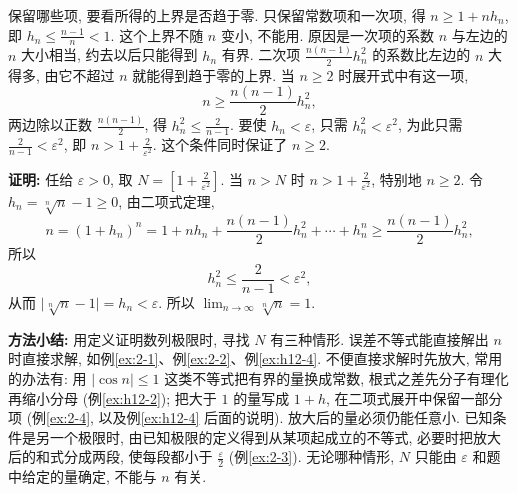 \documentclass[UTF8,openany]{ctexbook}
\theoremstyle{chinesetextbook}
\newenvironment{cnproof}{\par\indent\textbf{证明:} \ignorespaces}{\par}
\begin{document}
保留哪些项, 要看所得的上界是否趋于零. 只保留常数项和一次项, 得 $n\ge1+nh_n$, 即 $\displaystyle h_n\le\frac{n-1}n<1$. 这个上界不随 $n$ 变小, 不能用. 原因是一次项的系数 $n$ 与左边的 $n$ 大小相当, 约去以后只能得到 $h_n$ 有界. 二次项 $\displaystyle\frac{n(n-1)}2h_n^2$ 的系数比左边的 $n$ 大得多, 由它不超过 $n$ 就能得到趋于零的上界. 当 $n\ge2$ 时展开式中有这一项,
\[
n\ge\frac{n(n-1)}2h_n^2,
\]
两边除以正数 $\displaystyle\frac{n(n-1)}2$, 得 $\displaystyle h_n^2\le\frac2{n-1}$. 要使 $h_n<\varepsilon$, 只需 $h_n^2<\varepsilon^2$, 为此只需 $\displaystyle\frac2{n-1}<\varepsilon^2$, 即 $\displaystyle n>1+\frac2{\varepsilon^2}$. 这个条件同时保证了 $n\ge2$.
\begin{cnproof}
任给 $\varepsilon>0$, 取 $\displaystyle N=\left[1+\frac2{\varepsilon^2}\right]$. 当 $n>N$ 时 $\displaystyle n>1+\frac2{\varepsilon^2}$, 特别地 $n\ge2$. 令 $h_n=\sqrt[n]n-1\ge0$, 由二项式定理,
\[
n=(1+h_n)^n=1+nh_n+\frac{n(n-1)}2h_n^2+\cdots+h_n^n\ge\frac{n(n-1)}2h_n^2,
\]
所以
\[
h_n^2\le\frac2{n-1}<\varepsilon^2,
\]
从而 $\bigl|\sqrt[n]n-1\bigr|=h_n<\varepsilon$. 所以 $\displaystyle\lim_{n\to\infty}\sqrt[n]n=1$.
\end{cnproof}
\par\indent\textbf{方法小结:} 用定义证明数列极限时, 寻找 $N$ 有三种情形. 误差不等式能直接解出 $n$ 时直接求解, 如例\ref{ex:2-1}、例\ref{ex:2-2}、例\ref{ex:h12-4}. 不便直接求解时先放大, 常用的办法有: 用 $|\cos n|\le1$ 这类不等式把有界的量换成常数, 根式之差先分子有理化再缩小分母 (例\ref{ex:h12-2}); 把大于 $1$ 的量写成 $1+h$, 在二项式展开中保留一部分项 (例\ref{ex:2-4}, 以及例\ref{ex:h12-4} 后面的说明). 放大后的量必须仍能任意小. 已知条件是另一个极限时, 由已知极限的定义得到从某项起成立的不等式, 必要时把放大后的和式分成两段, 使每段都小于 $\displaystyle\frac\varepsilon2$ (例\ref{ex:2-3}). 无论哪种情形, $N$ 只能由 $\varepsilon$ 和题中给定的量确定, 不能与 $n$ 有关.
\end{document}
